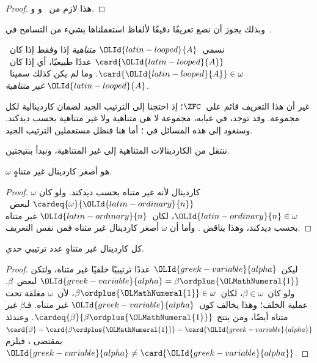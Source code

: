 \documentclass[../../../include/open-logic-section]{subfiles}
\begin{document}
\begin{proof}
هذا لازم من~
و
و.
\end{proof}

وبذلك يجوز أن نضع تعريفًا دقيقًا لألفاظ استعملناها بشيء من التسامح
في~.

\begin{defn}
نسمي~${\OLId{latin-looped}{A}}$ \emph{متناهية} إذا وفقط إذا كان~$\card{{\OLId{latin-looped}{A}}}$ عددًا طبيعيًا،
أي إذا كان~$\card{{\OLId{latin-looped}{A}}} \in \omega$. وما لم يكن كذلك سمينا~${\OLId{latin-looped}{A}}$
\emph{غير متناهية}.
\end{defn}
\noindent
غير أن هذا التعريف قائم على~$\ZFC$؛ إذ احتجنا إلى الترتيب الجيد
لضمان كاردينالية لكل مجموعة. وقد توجد، في غيابه، مجموعة لا هي متناهية
ولا غير متناهية بحسب ديدكند. وسنعود إلى هذه المسائل في
؛ أما هنا فنظل مستعملين الترتيب الجيد.

ننتقل من الكاردينالات المتناهية إلى غير المتناهية، ونبدأ بنتيجتين.

\begin{cor}
$\omega$ هو أصغر كاردينال غير متناهٍ.
\end{cor}

\begin{proof}
$\omega$ كاردينال لأنه غير متناه بحسب ديدكند. ولو كان
$\cardeq{\omega}{{\OLId{latin-ordinary}{n}}}$ لبعض~${\OLId{latin-ordinary}{n}} \in \omega$، لكان~${\OLId{latin-ordinary}{n}}$ غير متناه بحسب
ديدكند، وهذا يناقض
. وأما أن
$\omega$ أصغر كاردينال غير متناه فمن نفس التعريف.
\end{proof}

\begin{cor}
كل كاردينال غير متناهٍ عدد ترتيبي حدي.
\end{cor}

\begin{proof}
ليكن~${\OLId{greek-variable}{alpha}}$ عددًا ترتيبيًا خلفيًا غير متناه، ولتكن
${\OLId{greek-variable}{alpha}} = \beta \ordplus {\OLMathNumeral{1}}$ لبعض~$\beta$. ولو كان~$\beta\in\omega$،
لكان~$\beta\ordplus {\OLMathNumeral{1}}\in\omega$، لأن~$\omega$ مغلقة تحت عملية الخلف؛
وهذا يخالف كون~${\OLId{greek-variable}{alpha}}$ غير متناه. فـ$\beta$ غير متناه أيضًا، ومن
 ينتج
$\cardeq{\beta}{\beta \ordplus {\OLMathNumeral{1}}}$. وعندئذ
$\card{\beta} = \card{\beta\ordplus {\OLMathNumeral{1}}} = \card{{\OLId{greek-variable}{alpha}}}$ بمقتضى
، فيلزم
${\OLId{greek-variable}{alpha}} \neq \card{{\OLId{greek-variable}{alpha}}}$.
\end{proof}
\end{document}
